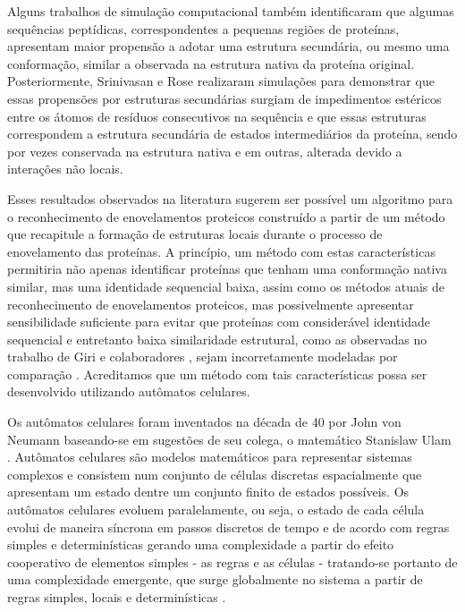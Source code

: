Alguns trabalhos de simulação computacional \cite{AbagyanTotrov:1994, PedersenMoult:1997} também identificaram que algumas sequências peptídicas, correspondentes a pequenas regiões de proteínas, apresentam maior propensão a adotar uma estrutura secundária, ou mesmo uma conformação, similar a observada na estrutura nativa da proteína original. Posteriormente, Srinivasan e Rose \cite{SrinivasanRose:1999} realizaram simulações para demonstrar que essas propensões por estruturas secundárias surgiam de impedimentos estéricos entre os átomos de resíduos consecutivos na sequência e que essas estruturas correspondem a estrutura secundária de estados intermediários da proteína, sendo por vezes conservada na estrutura nativa e em outras, alterada devido a interações não locais.

Esses resultados observados na literatura sugerem ser possível um algoritmo para o reconhecimento de enovelamentos proteicos construído a partir de um método que recapitule a formação de estruturas locais durante o processo de enovelamento das proteínas. A princípio, um método com estas características permitiria não apenas identificar proteínas que tenham uma conformação nativa similar, mas uma identidade sequencial baixa, assim como os métodos atuais de reconhecimento de enovelamentos proteicos, mas possivelmente apresentar sensibilidade suficiente para evitar que proteínas com considerável identidade sequencial e entretanto baixa similaridade estrutural, como as observadas no trabalho de Giri e colaboradores \cite{Giri:2012}, sejam incorretamente modeladas por comparação \cite{Helles:2008}. Acreditamos que um método com tais características possa ser desenvolvido utilizando autômatos celulares.

Os autômatos celulares foram inventados na década de 40 por John von Neumann baseando-se em sugestões de seu colega, o matemático Stanislaw Ulam \cite{Mitchell:2009}. Autômatos celulares são modelos matemáticos para representar sistemas complexos e consistem num conjunto de células discretas espacialmente que apresentam um estado dentre um conjunto finito de estados possíveis. Os autômatos celulares evoluem paralelamente, ou seja, o estado de cada célula evolui de maneira síncrona em passos discretos de tempo e de acordo com regras simples e determinísticas gerando uma complexidade a partir do efeito cooperativo de elementos simples - as regras e as células - tratando-se portanto de uma complexidade emergente, que surge globalmente no sistema a partir de regras simples, locais e determinísticas \cite{Wolfram:1984}.

